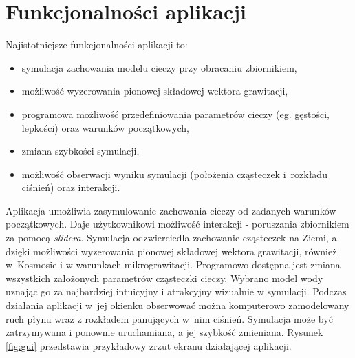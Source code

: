 
\section{Funkcjonalności aplikacji}
Najistotniejsze funkcjonalności aplikacji to:
\begin{itemize}
    \item symulacja zachowania modelu cieczy przy obracaniu zbiornikiem,
    \item możliwość wyzerowania pionowej składowej wektora grawitacji,
    \item programowa możliwość przedefiniowania parametrów cieczy (eg. gęstości, lepkości) oraz warunków początkowych,
    \item zmiana szybkości symulacji,
    \item możliwość obserwacji wyniku symulacji (położenia cząsteczek i~rozkładu ciśnień) oraz interakcji.
\end{itemize}

Aplikacja umożliwia zasymulowanie zachowania cieczy od zadanych warunków początkowych. Daje użytkownikowi możliwość interakcji - poruszania zbiornikiem za pomocą \textit{slidera}. Symulacja odzwierciedla zachowanie cząsteczek na Ziemi, a dzięki możliwości wyzerowania pionowej składowej wektora grawitacji, również w~Kosmosie i w warunkach mikrograwitacji. Programowo dostępna jest zmiana wszystkich założonych parametrów cząsteczki cieczy. Wybrano model wody uznając go za najbardziej intuicyjny i atrakcyjny wizualnie w symulacji. Podczas działania aplikacji w~jej okienku obserwować można komputerowo zamodelowany ruch płynu wraz z rozkładem panujących w~nim ciśnień. Symulacja może być zatrzymywana i ponownie uruchamiana, a jej szybkość zmieniana. Rysunek \ref{fig:gui} przedstawia przykładowy zrzut ekranu działającej aplikacji.

